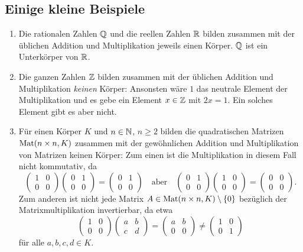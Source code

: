 \subsection{Einige kleine Beispiele}
\begin{enumerate}[leftmargin=*]
 \item
  Die rationalen Zahlen $\mathbb{Q}$ und die reellen Zahlen $\mathbb{R}$ bilden zusammen mit der üblichen Addition und Multiplikation jeweils einen Körper. $\mathbb{Q}$ ist ein Unterkörper von $\mathbb{R}$.
 \item
  Die ganzen Zahlen $\mathbb{Z}$ bilden zusammen mit der üblichen Addition und Multiplikation \emph{keinen} Körper: Ansonsten wäre $1$ das neutrale Element der Multiplikation und es gebe ein Element $x \in \mathbb{Z}$ mit $2x = 1$. Ein solches Element gibt es aber nicht.
 \item
  Für einen Körper $K$ und $n \in \mathbb{N}$, $n \geq 2$ bilden die quadratischen Matrizen $\mathrm{Mat}(n \times n, K)$ zusammen mit der gewöhnlichen Addition und Multiplikation von Matrizen keinen Körper: Zum einen ist die Multiplikation in diesem Fall nicht kommutativ, da
  \[
   \begin{pmatrix}
    1 & 0 \\
    0 & 0
   \end{pmatrix}
   \begin{pmatrix}
    0 & 1 \\
    0 & 0
   \end{pmatrix}
   =
   \begin{pmatrix}
    0 & 1 \\
    0 & 0
   \end{pmatrix}
   \quad\text{aber}\quad
   \begin{pmatrix}
    0 & 1 \\
    0 & 0
   \end{pmatrix}
   \begin{pmatrix}
    1 & 0 \\
    0 & 0
   \end{pmatrix}
   =
   \begin{pmatrix}
    0 & 0 \\
    0 & 0
   \end{pmatrix}.
  \]
  Zum anderen ist nicht jede Matrix $A \in \mathrm{Mat}(n \times n, K) \setminus \{0\}$ bezüglich der Matrixmultiplikation invertierbar, da etwa
  \[
   \begin{pmatrix}
    1 & 0 \\
    0 & 0
   \end{pmatrix}
   \begin{pmatrix}
    a & b \\
    c & d
   \end{pmatrix}
   =
   \begin{pmatrix}
    a & b \\
    0 & 0
   \end{pmatrix}
   \neq
   \begin{pmatrix}
    1 & 0 \\
    0 & 1
   \end{pmatrix}
  \]
  für alle $a,b,c,d \in K$.
\end{enumerate}





